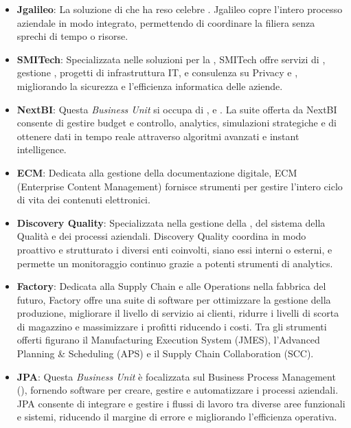 \begin{itemize}
    \item \textbf{Jgalileo}: La soluzione di  che ha reso celebre \myCompany. Jgalileo copre l'intero processo aziendale in modo integrato, permettendo di coordinare la filiera senza sprechi di tempo o risorse.
    \item \textbf{SMITech}: Specializzata nelle soluzioni per la ,  SMITech offre servizi di , gestione , progetti di infrastruttura IT, e consulenza su Privacy e , migliorando la sicurezza e l'efficienza informatica delle aziende.
    \item \textbf{NextBI}: Questa \emph{Business Unit} si occupa di ,  e . La suite offerta da NextBI consente di gestire budget e controllo, analytics, simulazioni strategiche e di ottenere dati in tempo reale attraverso algoritmi avanzati e instant intelligence.
    \item \textbf{ECM}: Dedicata alla gestione della documentazione digitale, ECM (Enterprise Content Management)
    fornisce strumenti per gestire l'intero ciclo di vita dei contenuti elettronici.
    \item \textbf{Discovery Quality}: Specializzata nella gestione della , del sistema della Qualità e dei processi aziendali. Discovery Quality coordina in modo proattivo e strutturato i diversi enti coinvolti, siano essi interni o esterni, e permette un monitoraggio continuo grazie a potenti strumenti di analytics.
    \item \textbf{Factory}: Dedicata alla Supply Chain e alle Operations nella fabbrica del futuro, Factory offre una suite di software per ottimizzare la gestione della produzione, migliorare il livello di servizio ai clienti, ridurre i livelli di scorta di magazzino e massimizzare i profitti riducendo i costi. Tra gli strumenti offerti figurano il Manufacturing Execution System (JMES), l'Advanced Planning \& Scheduling (APS) e il Supply Chain Collaboration (SCC).
    \item \textbf{JPA}: Questa \emph{Business Unit} è focalizzata sul Business Process Management (), fornendo software per creare, gestire e automatizzare i processi aziendali. JPA consente di integrare e gestire i flussi di lavoro tra diverse aree funzionali e sistemi, riducendo il margine di errore e migliorando l'efficienza operativa.

\end{itemize}
